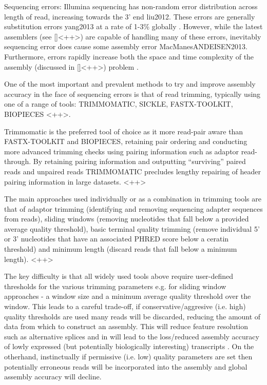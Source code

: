 Sequencing errors: Illumina sequencing has non-random error distribution across length of read, increasing towards the 3' end liu2012. These errors are generally substitution errors yang2013 at a rate of 1-3\% globally \citep{MacManes2014}.  However, while the latest assemblers (see \ref{}<++>) are capable of %
handling many of these errors, inevitably sequencing error does cause some
assembly error MacManesANDEISEN2013.
Furthermore, errors rapidly increase both the space and time complexity of the assembly (discussed in \ref{}<++>) problem \citep{MacManes2014}.

One of the most important and prevalent methods to try and improve assembly
accuracy in the face of sequencing errors is that of read trimming, typically
using one of a range of tools: TRIMMOMATIC, SICKLE, FASTX-TOOLKIT, BIOPIECES \citep{}<++>. %

Trimmomatic is the preferred tool of choice as it more read-pair aware than
FASTX-TOOLKIT and BIOPIECES, retaining pair ordering and conducting more
advanced trimming checks using pairing information such as adaptor read-through.
By retaining pairing information and outputting ``surviving'' paired reads and
unpaired reads TRIMMOMATIC precludes lengthy repairing of header pairing information
in large datasets. \citep{}<++> %

The main approaches used individually or as a combination in trimming tools are that 
of adaptor trimming (identifying and removing sequencing adapter sequences from reads),
sliding windows (removing nucleotides that fall below a provided average quality threshold),
basic terminal quality trimming (remove individual 5' or 3' nucleotides that have an associated PHRED score
below a ceratin threshold) and minimum length (discard reads that fall below a minimum length). 
\citep{}<++> %

The key difficulty is that all widely used tools above require user-defined thresholds
for the various trimming parameters e.g. for sliding window approaches - a window size
and a minimum average quality threshold over the window.  
This leads to a careful trade-off, if conservative/aggresive (i.e. high) quality thresholds
are used many reads will be discarded, reducing the amount of data from which to 
construct an assembly.  This will reduce feature resolution such as alternative splices 
and in will lead to the loss/reduced assembly accuracy of lowly expressed (but potentially biologically interesting) transcripts \citep{MacManes2014}. On the otherhand, instinctually if permissive (i.e. low)
quality parameters are set then potentially erroneous reads will be incorporated into the assembly
and global assembly accuracy will decline. 

